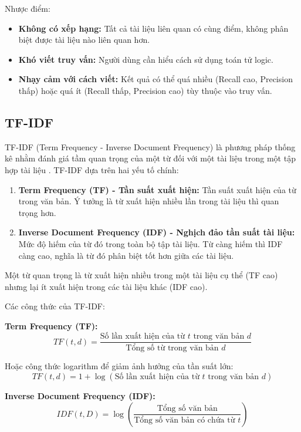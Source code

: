 \documentclass[../BTL.tex]{subfiles}
\begin{document}
Nhược điểm:
\begin{itemize}
    \item \textbf{Không có xếp hạng:} Tất cả tài liệu liên quan có cùng điểm, không phân biệt được tài liệu nào liên quan hơn.
    
    \item \textbf{Khó viết truy vấn:} Người dùng cần hiểu cách sử dụng toán tử logic.
    
    \item \textbf{Nhạy cảm với cách viết:} Kết quả có thể quá nhiều (Recall cao, Precision thấp) hoặc quá ít (Recall thấp, Precision cao) tùy thuộc vào truy vấn.
\end{itemize}

\subsection{TF-IDF}
TF-IDF (Term Frequency - Inverse Document Frequency) là phương pháp thống kê nhằm đánh giá tầm quan trọng của một từ đối với một tài liệu trong một tập hợp tài liệu \cite{manning2008introduction}. TF-IDF dựa trên hai yếu tố chính:

\begin{enumerate}
    \item \textbf{Term Frequency (TF) - Tần suất xuất hiện:} Tần suất xuất hiện của từ trong văn bản. Ý tưởng là từ xuất hiện nhiều lần trong tài liệu thì quan trọng hơn.
    
    \item \textbf{Inverse Document Frequency (IDF) - Nghịch đảo tần suất tài liệu:} Mức độ hiếm của từ đó trong toàn bộ tập tài liệu. Từ càng hiếm thì IDF càng cao, nghĩa là từ đó phân biệt tốt hơn giữa các tài liệu.
\end{enumerate}

Một từ quan trọng là từ xuất hiện nhiều trong một tài liệu cụ thể (TF cao) nhưng lại ít xuất hiện trong các tài liệu khác (IDF cao).

Các công thức của TF-IDF:

\textbf{Term Frequency (TF):}
$$
TF(t, d) = \frac{\text{Số lần xuất hiện của từ } t \text{ trong văn bản } d}{\text{Tổng số từ trong văn bản } d}
$$

Hoặc công thức logarithm để giảm ảnh hưởng của tần suất lớn:
$$
TF(t, d) = 1 + \log(\text{Số lần xuất hiện của từ } t \text{ trong văn bản } d)
$$

\textbf{Inverse Document Frequency (IDF):}
$$
IDF(t, D) = \log \left( \frac{\text{Tổng số văn bản}}{\text{Tổng số văn bản có chứa từ } t} \right)
$$
\end{document}
